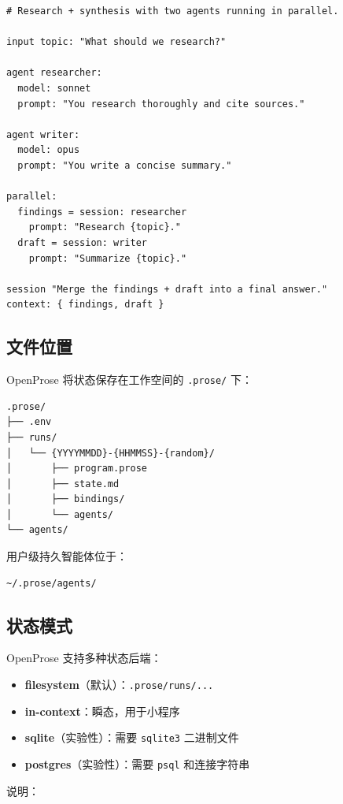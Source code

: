 \begin{lstlisting}
# Research + synthesis with two agents running in parallel.

input topic: "What should we research?"

agent researcher:
  model: sonnet
  prompt: "You research thoroughly and cite sources."

agent writer:
  model: opus
  prompt: "You write a concise summary."

parallel:
  findings = session: researcher
    prompt: "Research {topic}."
  draft = session: writer
    prompt: "Summarize {topic}."

session "Merge the findings + draft into a final answer."
context: { findings, draft }
\end{lstlisting}


\subsection{文件位置}


OpenProse 将状态保存在工作空间的 \texttt{.prose/} 下：

\begin{lstlisting}
.prose/
├── .env
├── runs/
│   └── {YYYYMMDD}-{HHMMSS}-{random}/
│       ├── program.prose
│       ├── state.md
│       ├── bindings/
│       └── agents/
└── agents/
\end{lstlisting}


用户级持久智能体位于：

\begin{lstlisting}
~/.prose/agents/
\end{lstlisting}


\subsection{状态模式}


OpenProse 支持多种状态后端：

\begin{itemize}
  \item \textbf{filesystem}（默认）：\texttt{.prose/runs/...}
  \item \textbf{in-context}：瞬态，用于小程序
  \item \textbf{sqlite}（实验性）：需要 \texttt{sqlite3} 二进制文件
  \item \textbf{postgres}（实验性）：需要 \texttt{psql} 和连接字符串
\end{itemize}


说明：

